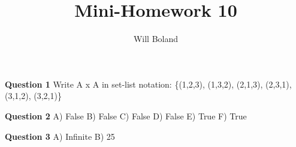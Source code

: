 \documentclass{article}
\begin{document}
\title{Mini-Homework 10}
\author{Will Boland}
\maketitle

\textbf{Question 1}\newline
Write A x A in set-list notation: \{(1,2,3), (1,3,2), (2,1,3), (2,3,1), (3,1,2), (3,2,1)\}\newline

\textbf{Question 2}\newline
A) False\newline
B) False\newline
C) False\newline
D) False\newline
E) True\newline
F) True\newline

\textbf{Question 3}\newline
A) Infinite\newline
B) 25\newline
\enddocument
\end{document}
